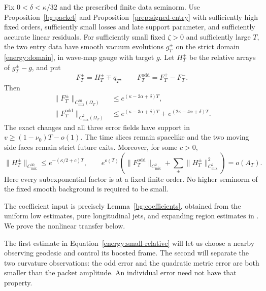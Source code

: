 \begin{proposition}
\label{energy:signed-experiment}
Fix \(0<\delta<\kappa/32\) and the prescribed finite data seminorm.
Use Proposition~\ref{bg:packet} and Proposition~\ref{prep:signed-entry}
with sufficiently high fixed orders, sufficiently small losses and late
support parameter, and sufficiently accurate linear residuals. For
sufficiently small fixed \(\zeta>0\) and sufficiently large \(T\), the
two entry data have smooth vacuum evolutions \(g_T^\pm\) on the strict
domain \eqref{energy:domain}, in wave-map gauge with target \(g\).
Let \(H_T^\pm\) be the relative arrays of \(g_T^\pm-g\), and put
\[
 F_T^\pm=H_T^\pm\mp q_T,\qquad
 F_T^{\mathrm{odd}}=F_T^+-F_T^-.
\]
Then
\begin{equation}\label{energy:conclusion}
 \begin{aligned}
 \lVert F_T^\pm\rVert_{C^{30}_{\mathrm{mix}}(\Omega_T)}
   &\le e^{(\kappa-2\alpha+\delta)T},\\
 \lVert F_T^{\mathrm{odd}}\rVert_{C^2_{\mathrm{mix}}(\Omega_T)}
   &\le e^{(\kappa-3\alpha+\delta)T}
            +e^{(2\kappa-4\alpha+\delta)T}.
 \end{aligned}
\end{equation}
The exact changes and all three error fields have support in
\(v\ge(1-\nu_0)T-o(1)\). The time slices remain spacelike and the two
moving side faces remain strict future exits. Moreover, for some
\(c>0\),
\begin{equation}\label{energy:small-relative}
 \lVert H_T^\pm\rVert_{C^{30}_{\mathrm{mix}}}
       \le e^{-(\kappa/2+c)T},\qquad
 e^{o(T)}\left(\lVert F_T^{\mathrm{odd}}\rVert_{C^2_{\mathrm{mix}}}
          +\sum_\pm\lVert H_T^\pm\rVert_{C^2_{\mathrm{mix}}}^2\right)
       =o(A_T).
\end{equation}
Here every subexponential factor is at a fixed finite order. No higher
seminorm of the fixed smooth background is required to be small.
\end{proposition}

The coefficient input is precisely Lemma~\ref{bg:coefficients}, obtained
from the uniform low estimates, pure longitudinal jets, and expanding
region estimates in \cite[, , , , ]{Foundation}. We prove the nonlinear transfer below.

The first estimate in Equation~\eqref{energy:small-relative} will let us
choose a nearby observing geodesic and control its boosted frame. The
second will separate the two curvature observations: the odd error and
the quadratic metric error are both smaller than the packet amplitude.
An individual error need not have that property.

